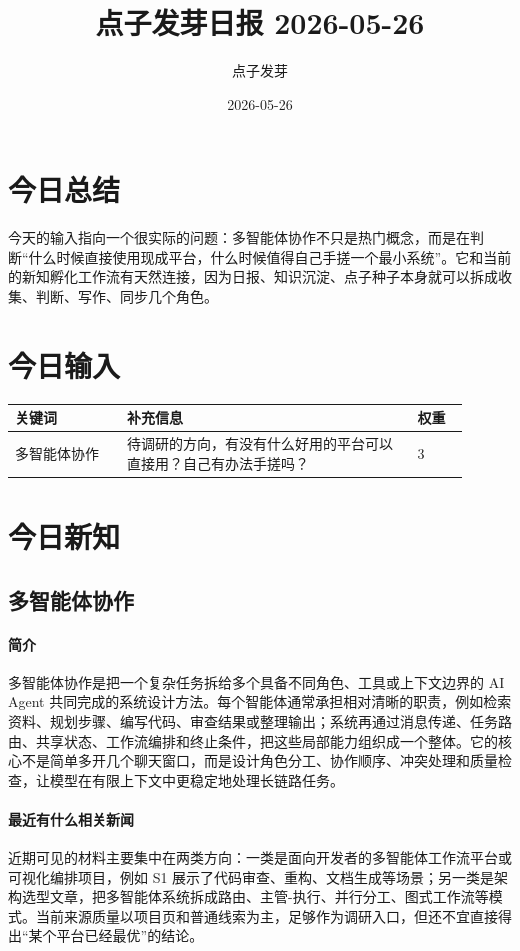 \documentclass[UTF8,zihao=-4]{ctexart}
\title{\bfseries 点子发芽日报 2026-05-26}
\author{点子发芽}
\date{2026-05-26}
\begin{document}
\maketitle
\section*{今日总结}
今天的输入指向一个很实际的问题：多智能体协作不只是热门概念，而是在判断“什么时候直接使用现成平台，什么时候值得自己手搓一个最小系统”。它和当前的新知孵化工作流有天然连接，因为日报、知识沉淀、点子种子本身就可以拆成收集、判断、写作、同步几个角色。
\section*{今日输入}
\begin{longtable}{|p{0.22\linewidth}|p{0.58\linewidth}|p{0.10\linewidth}|}
\hline
\textbf{关键词} & \textbf{补充信息} & \textbf{权重} \\
\hline
多智能体协作 & 待调研的方向，有没有什么好用的平台可以直接用？自己有办法手搓吗？ & 3 \\
\hline
\end{longtable}
\section*{今日新知}
\subsection*{多智能体协作}
\paragraph{简介} 多智能体协作是把一个复杂任务拆给多个具备不同角色、工具或上下文边界的 AI Agent 共同完成的系统设计方法。每个智能体通常承担相对清晰的职责，例如检索资料、规划步骤、编写代码、审查结果或整理输出；系统再通过消息传递、任务路由、共享状态、工作流编排和终止条件，把这些局部能力组织成一个整体。它的核心不是简单多开几个聊天窗口，而是设计角色分工、协作顺序、冲突处理和质量检查，让模型在有限上下文中更稳定地处理长链路任务。
\paragraph{最近有什么相关新闻} 近期可见的材料主要集中在两类方向：一类是面向开发者的多智能体工作流平台或可视化编排项目，例如 S1 展示了代码审查、重构、文档生成等场景；另一类是架构选型文章，把多智能体系统拆成路由、主管-执行、并行分工、图式工作流等模式。当前来源质量以项目页和普通线索为主，足够作为调研入口，但还不宜直接得出“某个平台已经最优”的结论。
\end{document}
